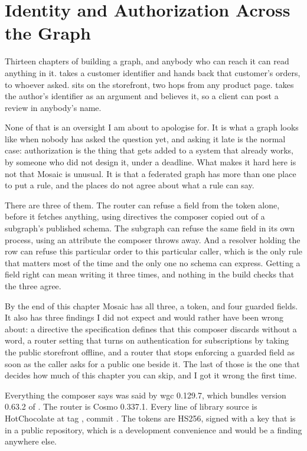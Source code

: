 \chapter{Identity and Authorization Across the Graph}
\label{ch:identity-and-authorization}

Thirteen chapters of building a graph, and anybody who can reach it can read
anything in it.  takes a customer identifier and
hands back that customer's orders, to whoever asked.  sits
on the storefront, two hops from any product page.  takes the
author's identifier as an argument and believes it, so a client can post a
review in anybody's name.

None of that is an oversight I am about to apologise for. It is what a graph
looks like when nobody has asked the question yet, and asking it late is the
normal case: authorization is the thing that gets added to a system that already
works, by someone who did not design it, under a deadline. What makes it hard
here is not that Mosaic is unusual. It is that a federated graph has more than
one place to put a rule, and the places do not agree about what a rule can say.

There are three of them. The router can refuse a field from the token alone,
before it fetches anything, using directives the composer copied out of a
subgraph's published schema. The subgraph can refuse the same field in its own
process, using an attribute the composer throws away. And a resolver holding the
row can refuse this particular order to this particular caller, which is the
only rule that matters most of the time and the only one no schema can express.
Getting a field right can mean writing it three times, and nothing in the build
checks that the three agree.

By the end of this chapter Mosaic has all three, a token, and four guarded
fields. It also has three findings I did not expect and would rather have been
wrong about: a directive the specification defines that this composer discards
without a word, a router setting that turns on authentication for subscriptions
by taking the public storefront offline, and a router that stops enforcing a
guarded field as soon as the caller asks for a public one beside it. The last of
those is the one that decides how much of this chapter you can skip, and I got
it wrong the first time.

Everything the composer says was said by wgc 0.129.7, which bundles version
0.63.2 of . The router is Cosmo 0.337.1. Every
line of library source is HotChocolate at tag , commit
. The tokens are HS256, signed with a key that is in a public
repository, which is a development convenience and would be a finding anywhere
else.

